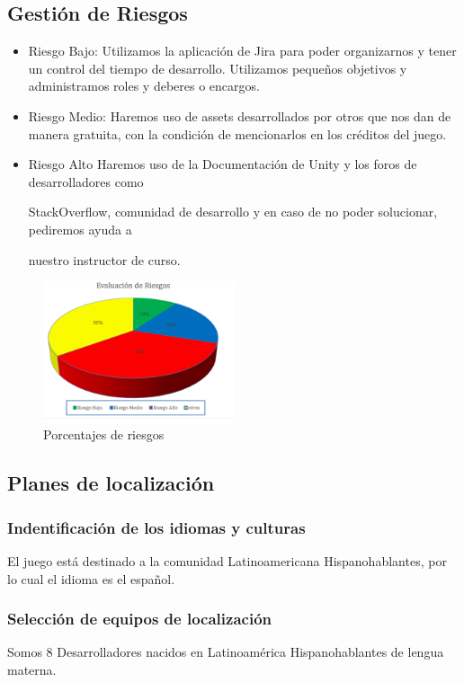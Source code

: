 \subsection{Gestión de Riesgos}
\begin{itemize}
	\item Riesgo Bajo:
	      Utilizamos la aplicación de Jira para poder organizarnos y tener un control del tiempo de desarrollo. Utilizamos pequeños objetivos y administramos roles y deberes o encargos.

	\item Riesgo Medio:
	      Haremos uso de assets desarrollados por otros que nos dan de manera gratuita, con la condición de mencionarlos en los créditos del juego.
	\item Riesgo Alto Haremos uso de la Documentación de Unity y los foros de desarrolladores como

	      StackOverflow, comunidad de desarrollo y en caso de no poder solucionar, pediremos ayuda a

	      nuestro instructor de curso.
\end{itemize}

\begin{figure}[!ht]
	\centering
	\includegraphics[width=0.5\textwidth]{Figures/0. General/riesgos.png}
	\caption{Porcentajes de riesgos}
	\label{fig:riesgos}
\end{figure}

\subsection{Planes de localización}
\subsubsection{Indentificación de los idiomas y culturas}
El juego está destinado a la comunidad Latinoamericana Hispanohablantes, por lo cual el idioma es el español.
\subsubsection{Selección de equipos de localización}
Somos 8 Desarrolladores nacidos en Latinoamérica Hispanohablantes de lengua materna.
